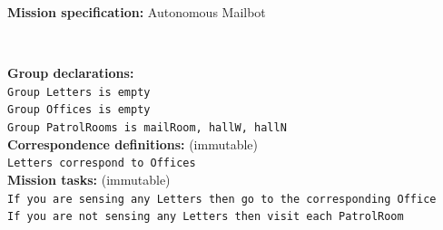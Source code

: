 \begin{algorithm}
	\textbf{Mission specification:} Autonomous Mailbot
	
	\vspace{-7 pt}
	\hrulefill\\
	{\small
	
	\textbf{Group declarations:}\\
	\texttt{Group Letters is empty} \\
	\texttt{Group Offices is empty} \\
	\texttt{Group PatrolRooms is mailRoom, hallW, hallN}\\ %
	
	\textbf{Correspondence definitions:} (immutable)\\ %
	\texttt{Letters correspond to Offices}\\
	
	
	\textbf{Mission tasks:} (immutable)\\
	\texttt{If you are sensing any Letters then go to the corresponding Office}\\
	\texttt{If you are not sensing any Letters then visit each PatrolRoom}\\
	
	
}
\end{algorithm}

